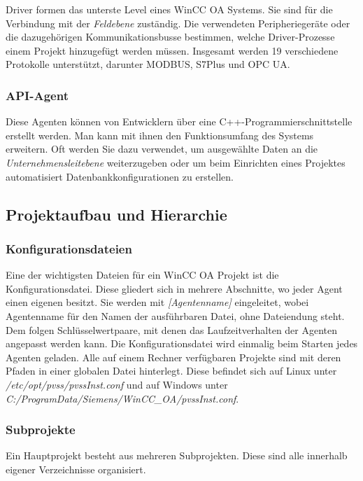 Driver formen das unterste Level eines WinCC OA Systems. Sie sind für die Verbindung mit der \textit{Feldebene} zuständig. Die verwendeten Peripheriegeräte
oder die dazugehörigen Kommunikationsbusse bestimmen, welche Driver-Prozesse einem Projekt hinzugefügt werden müssen. Insgesamt werden 19 verschiedene Protokolle 
unterstützt, darunter MODBUS, S7Plus und OPC UA.

\subsubsection{API-Agent}

Diese Agenten können von Entwicklern über eine C++-Programmierschnittstelle erstellt werden. Man kann mit ihnen 
den Funktionsumfang des Systems erweitern. Oft werden Sie dazu verwendet, um ausgewählte Daten an die \textit{Unternehmensleitebene}
weiterzugeben oder um beim Einrichten eines Projektes automatisiert Datenbankkonfigurationen zu erstellen. 


\subsection{Projektaufbau und Hierarchie}

\subsubsection{Konfigurationsdateien}

Eine der wichtigsten Dateien für ein WinCC OA Projekt ist die Konfigurationsdatei. Diese gliedert sich in mehrere
Abschnitte, wo jeder Agent einen eigenen besitzt. Sie werden mit \textit{[Agentenname]} eingeleitet, wobei Agentenname
für den Namen der ausführbaren Datei, ohne Dateiendung steht. Dem folgen Schlüsselwertpaare, mit denen das Laufzeitverhalten
der Agenten angepasst werden kann. Die Konfigurationsdatei wird einmalig beim Starten jedes Agenten geladen. Alle auf einem
Rechner verfügbaren Projekte sind mit deren Pfaden in einer globalen Datei hinterlegt. 
Diese befindet sich auf Linux unter \textit{/etc/opt/pvss/pvssInst.conf} und auf Windows unter \\
\textit{C:/ProgramData/Siemens/WinCC\_OA/pvssInst.conf}.

\subsubsection{Subprojekte}
\label{cha:subproj}

Ein Hauptprojekt besteht aus mehreren Subprojekten. Diese sind alle innerhalb eigener Verzeichnisse organisiert.


